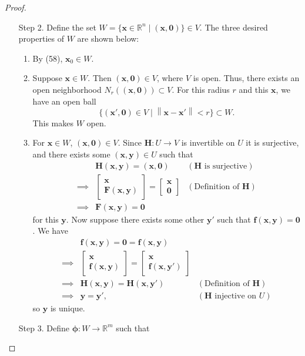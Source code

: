 \documentclass{article}
\newcommand{\R}{\mathbb{R}}
\newcommand{\x}{\mathbf{x}}
\newcommand{\F}{\mathbf{F}}
\newcommand{\f}{\mathbf{f}}
\newcommand{\y}{\mathbf{y}}
\newcommand{\ze}{\mathbf{0}}
\newcommand{\norm}[1]{\left\lVert#1\right\rVert}
\theoremstyle{definition}
\begin{document}
\begin{proof}
\begin{enumerate}
			\item[Step 2.]  Define the set $ W =\{\x\in\R^n\mid (\x,\ze)\}\in V $. The three desired properties of $ W $ are shown below:
			\begin{enumerate}
				\item By (58), $ \x_0\in W $. 
				\item Suppose $ \x \in W $. Then $ (\x,\ze)\in V $, where $ V $ is open. Thus, there exists an open neighborhood $ N_r((\x,\ze)) \subset V$. For this radius $ r $ and this $ \x $, we have an open ball $$ \{(\x',\ze) \in V \mid \norm{\x - \x'} < r\}\subset W .$$ This makes $ W $ open.  
				\item For $ \x\in W $, $ (\x,\ze)\in V $. Since $ \mathbf H:U\to V $ is invertible on $ U $ it is surjective, and there exists some $ (\x,\y)\in U $ such that 
				\begin{align*}
					&\mathbf H(\x,\y) = (\x,\ze) & (\mathbf H \text{ is surjective})\\
					\implies & \begin{bmatrix} \x \\ \F(\x,\y) \end{bmatrix}  = \begin{bmatrix}
						\x \\ \ze 
					\end{bmatrix} & (\text{Definition of } \mathbf H)\\
					\implies & \F(\x,\y) = \ze
				\end{align*}
				for this $ \y $. Now suppose there exists some other $ \y' $ such that $ \f(\x,\y)=\ze $. We have 
				\begin{align*}
					&	\f(\x,\y)=\ze=\f(\x,\y)\\
					\implies & \begin{bmatrix}
						\x \\ \f(\x,\y)
					\end{bmatrix} = \begin{bmatrix}
						\x \\ \f(\x,\y')
					\end{bmatrix}\\ 
					\implies & \mathbf H(\x,\y) = \mathbf H(\x,\y')& (\text{Definition of } \mathbf H)\\
					\implies & \y = \y', & (\mathbf H \text{ injective on }U ) 
				\end{align*}
				so $ \y $ is unique. 
			\end{enumerate}
			\item [Step 3.] Define $ \boldsymbol{\phi}:W\to\R^m $ such that 

\end{enumerate}
\end{proof}
\end{document}
